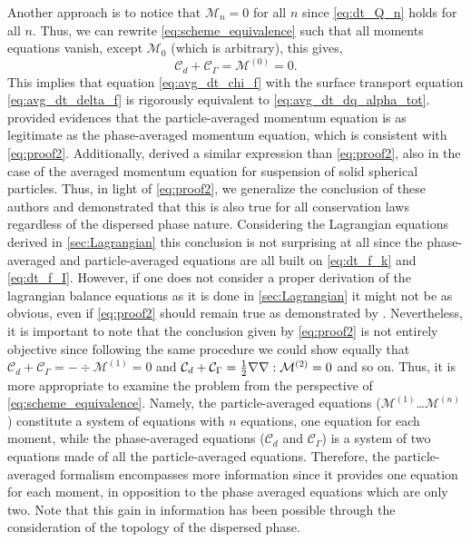 Another approach is to notice that $\mathcal{M}_n=0$ for all $n$ since \ref{eq:dt_Q_n} holds for all $n$. 
Thus, we can rewrite \ref{eq:scheme_equivalence} such that all moments equations vanish, except $\mathcal{M}_0$ (which is arbitrary), this gives, 
\begin{equation}
    \mathcal{C}_d 
    + \mathcal{C}_\Gamma 
    = \mathcal{M}^{(0)} = 0.
    \label{eq:proof2}
\end{equation}
This implies that equation \ref{eq:avg_dt_chi_f} with the surface transport equation \ref{eq:avg_dt_delta_f} is rigorously equivalent to \ref{eq:avg_dt_dq_alpha_tot}.
\citet[Appendix A]{zhang1997momentum} provided evidences that the particle-averaged momentum equation is as legitimate as the phase-averaged momentum equation, which is consistent with \ref{eq:proof2}. 
Additionally, \citet[Appendix A]{nott2011suspension} derived a similar expression than \ref{eq:proof2}, also in the case of the averaged momentum equation for suspension of solid spherical particles.
Thus, in light of \ref{eq:proof2}, we generalize the conclusion of these authors and demonstrated that this is also true for all conservation laws regardless of the dispersed phase nature.  
Considering the Lagrangian equations derived in \ref{sec:Lagrangian} this conclusion is not surprising at all since the phase-averaged and particle-averaged equations are all built on \ref{eq:dt_f_k} and \ref{eq:dt_f_I}.
However, if one does not consider a proper derivation of the lagrangian balance equations as it is done in \ref{sec:Lagrangian} it might not be as obvious, even if \ref{eq:proof2} should remain true as demonstrated by \citet{zhang1997momentum,nott2011suspension}.
Nevertheless, it is important to note that the conclusion given by \ref{eq:proof2} is not entirely objective since following the same procedure we could show equally that $\mathcal{C}_d+\mathcal{C}_\Gamma  = -\div\mathcal{M}^{(1)}=0$ and $\mathcal{C}_d+\mathcal{C}_\Gamma  = \frac{1}{2}\mathbf{\nabla}\mathbf{\nabla}:\mathcal{M}^{(2)}=0$ and so on. 
Thus, it is more appropriate to examine the problem from the perspective of \ref{eq:scheme_equivalence}. 
Namely, the particle-averaged equations ($\mathcal{M}^{(1)}$\ldots $\mathcal{M}^{(n)}$) constitute a system of equations with $n$ equations, one equation for each moment, while the phase-averaged equations ($\mathcal{C}_d$ and $\mathcal{C}_\Gamma$) is a system of two equations made of all the particle-averaged equations.
Therefore, the particle-averaged formalism encompasses more information since it provides one equation for each moment, in opposition to the phase averaged equations which are only two. 
Note that this gain in information has been possible through the consideration of the topology of the dispersed phase. 




